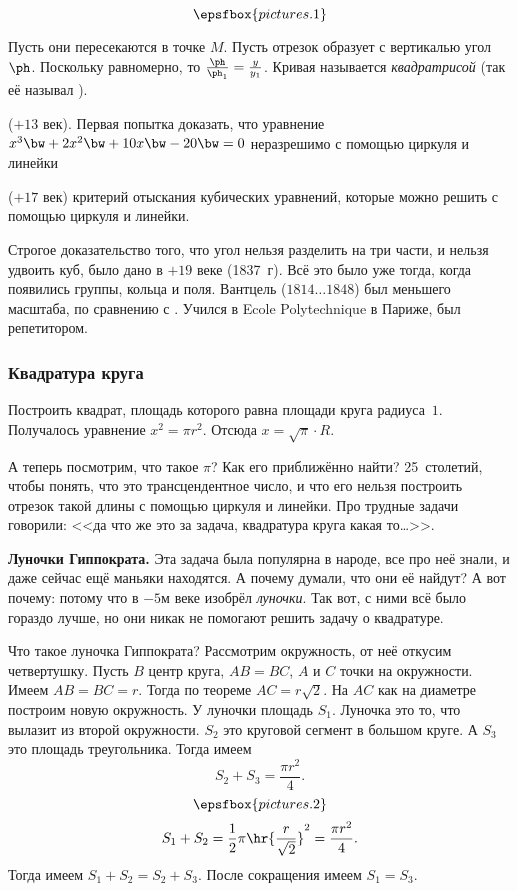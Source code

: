 \documentclass[a4paper,oneside,fleqn,10pt]{article}
\newcommand{\pe}[2]{${#1}\ldots{#2}$}
\newcommand{\cpic}[1]{$$\epsfbox{pictures.#1}$$}
\begin{document}
 \cpic{1}


Пусть они пересекаются в точке $M$.  Пусть отрезок образует с
вертикалью угол $\ph$.  Поскольку равномерно, то $\frac{\ph}{\ph_1} =
\frac{y}{y_1}$.  Кривая называется \emph{квадратрисой} (так её называл
).

 ($+13$ век). Первая попытка доказать, что
уравнение $x^3 \bw+ 2x^2 \bw+ 10x \bw- 20 \bw= 0$ неразрешимо с
помощью циркуля и линейки 

 ($+17$ век) критерий отыскания кубических уравнений,
которые можно решить с помощью циркуля и линейки.

Строгое доказательство того, что угол нельзя разделить на три части, и
нельзя удвоить куб, было дано 
в $+19$ веке (1837~г).  Всё это было уже тогда, когда появились
группы, кольца и поля. Вантцель (\pe{1814}{1848}) был меньшего
масштаба, по сравнению с .  Учился в Ecole
Polytechnique в Париже, был репетитором.

\subsubsection{Квадратура круга}

Построить квадрат, площадь которого равна площади круга радиуса~$1$.
Получалось уравнение $x^2 = \pi r^2$. Отсюда $x = \sqrt\pi \cdot R$.

А теперь посмотрим, что такое $\pi$?  Как его приближённо найти?
25~столетий, чтобы понять, что это трансцендентное число, и что его
нельзя построить отрезок такой длины с помощью циркуля и линейки.  Про
трудные задачи говорили: <<да что же это за задача, квадратура круга
какая то\ldots>>.


\textbf{Луночки Гиппократа.}  Эта задача была популярна в народе, все
про неё знали, и даже сейчас ещё маньяки находятся.  А почему думали,
что они её найдут? А вот почему: потому что 
в $-5$м веке изобрёл \emph{луночки}.  Так вот, с ними всё было гораздо
лучше, но они никак не помогают решить задачу о квадратуре.

Что такое луночка Гиппократа? Рассмотрим окружность, от неё откусим
четвертушку.  Пусть $B$ центр круга, $AB= BC$, $A$ и $C$ точки на
окружности.  Имеем $AB = BC = r$. Тогда по теореме
 $AC = r\sqrt2$.  На $AC$ как на диаметре
построим новую окружность. У луночки площадь $S_1$.  Луночка это то,
что вылазит из второй окружности. $S_2$ это круговой сегмент в большом
круге. А $S_3$ это площадь треугольника. Тогда имеем
$$S_2 + S_3 = \frac{\pi r^2}{4}.$$ \cpic{2}
$$S_1 + S_2 = \frac12 \pi \hr{\frac{r}{\sqrt2}}^2 = \frac{\pi
  r^2}{4}.$$ Тогда имеем $S_1 + S_2 = S_2 + S_3$. После сокращения
имеем $S_1 = S_3$.
\end{document}
